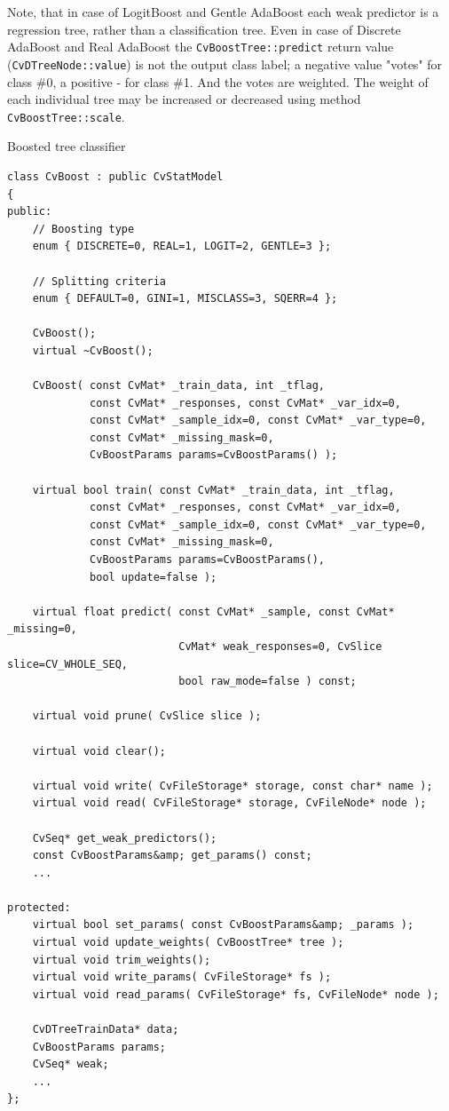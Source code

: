 Note, that in case of LogitBoost and Gentle AdaBoost each weak predictor is a regression tree, rather than a classification tree. Even in case of Discrete AdaBoost and Real AdaBoost the \texttt{CvBoostTree::predict} return value (\texttt{CvDTreeNode::value}) is not the output class label; a negative value "votes" for class \#0, a positive - for class \#1. And the votes are weighted. The weight of each individual tree may be increased or decreased using method \texttt{CvBoostTree::scale}.



Boosted tree classifier

\begin{lstlisting}
class CvBoost : public CvStatModel
{
public:
    // Boosting type
    enum { DISCRETE=0, REAL=1, LOGIT=2, GENTLE=3 };

    // Splitting criteria
    enum { DEFAULT=0, GINI=1, MISCLASS=3, SQERR=4 };

    CvBoost();
    virtual ~CvBoost();

    CvBoost( const CvMat* _train_data, int _tflag,
             const CvMat* _responses, const CvMat* _var_idx=0,
             const CvMat* _sample_idx=0, const CvMat* _var_type=0,
             const CvMat* _missing_mask=0,
             CvBoostParams params=CvBoostParams() );

    virtual bool train( const CvMat* _train_data, int _tflag,
             const CvMat* _responses, const CvMat* _var_idx=0,
             const CvMat* _sample_idx=0, const CvMat* _var_type=0,
             const CvMat* _missing_mask=0,
             CvBoostParams params=CvBoostParams(),
             bool update=false );

    virtual float predict( const CvMat* _sample, const CvMat* _missing=0,
                           CvMat* weak_responses=0, CvSlice slice=CV_WHOLE_SEQ,
                           bool raw_mode=false ) const;

    virtual void prune( CvSlice slice );

    virtual void clear();

    virtual void write( CvFileStorage* storage, const char* name );
    virtual void read( CvFileStorage* storage, CvFileNode* node );

    CvSeq* get_weak_predictors();
    const CvBoostParams&amp; get_params() const;
    ...

protected:
    virtual bool set_params( const CvBoostParams&amp; _params );
    virtual void update_weights( CvBoostTree* tree );
    virtual void trim_weights();
    virtual void write_params( CvFileStorage* fs );
    virtual void read_params( CvFileStorage* fs, CvFileNode* node );

    CvDTreeTrainData* data;
    CvBoostParams params;
    CvSeq* weak;
    ...
};
\end{lstlisting}

